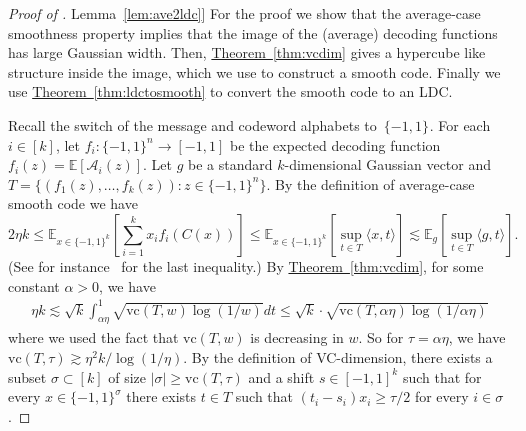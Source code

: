 \documentclass[11pt]{article}
\numberwithin{equation}{section}
\theoremstyle{definition}
\theoremstyle{plain}
\newcommand{\expref}[2]{\hyperref[#2]{#1~\ref{#2}}}
\newcommand{\pmset}[1]{\{-1,1\}^{#1}} %
\newcommand{\sBC}{{\{-1,1\}}}
\newcommand{\E}{\mathbb{E}}
\newcommand{\cA}{{\mathcal A}}
\newcommand{\vc}{{\mathrm{vc}}}
\newcommand{\inpro}[2]{\langle #1,#2 \rangle}
\newcommand{\beqn}{\begin{equation*}}
\newcommand{\eeqn}{\end{equation*}}
\begin{document}
\begin{proof}[Proof of \expref{Lemma}{lem:ave2ldc}]
For the proof we show that the average-case smoothness property implies that the image of the (average) decoding functions has large Gaussian width. 
Then, \expref{Theorem}{thm:vcdim} gives a hypercube like structure inside the image, which we use to construct a smooth code. Finally we use \expref{Theorem}{thm:ldctosmooth} to convert the smooth code to an LDC.

Recall the switch of the message and codeword alphabets to~$\pmset{}$.
For each $i\in[k]$, let $f_i:\pmset{n}\to [-1,1]$ be the expected decoding function $f_i(z)=\E[\cA_i(z)]$.
Let $g$ be a standard $k$-dimensional Gaussian vector and 
$T=\{(f_1(z),\dots,f_k(z)):z\in \sBC^n\}$.
By the definition of average-case smooth code we have 
\beqn
2\eta k\le \E_{x\in \sBC^k}\left[\sum_{i=1}^k x_if_i(C(x))\right]\le \E_{x\in \sBC^k}\left[\sup_{t\in T} \inpro{x}{t} \right] \lesssim \E_{g}\left[\sup_{t\in T} \inpro{g}{t} \right].
\eeqn 
(See for instance~\cite[Lemma~3.2.10]{Talagrand:2014} for the last inequality.)
By \expref{Theorem}{thm:vcdim}, for some constant $\alpha>0$, we have 
\begin{align*}
\eta k \lesssim \sqrt{k} \int_{\alpha\eta}^1 \sqrt{\vc(T,w)\log(1/w)} dt \le \sqrt{k} \cdot \sqrt{\vc(T,\alpha\eta) \log(1/\alpha\eta)}
\end{align*} 
 where we used the fact that $\vc(T,w)$ is decreasing in $w$. So for $\tau=\alpha\eta$, we have $\vc(T,\tau)\gtrsim \eta^2 k/\log(1/\eta)$. By the definition of VC-dimension, there exists a subset $\sigma\subset [k]$ of size $|\sigma| \ge \vc(T,\tau)$ and a shift $s\in [-1,1]^k$ such that for every $x\in \sBC^\sigma$ there exists $t\in T$ such that $(t_i-s_i)x_i\ge \tau/2$ for every $i\in \sigma$.
 

\end{proof}
\end{document}
